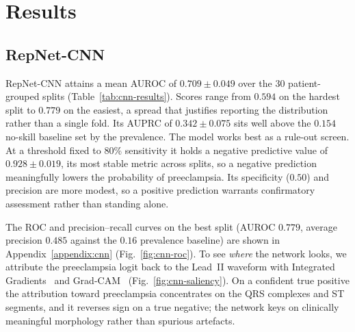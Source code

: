 \documentclass[sigconf,nonacm]{acmart}
\begin{document}
\section{Results}
\label{sec:results}

\subsection{RepNet-CNN}
\label{sec:results-cnn}

RepNet-CNN attains a mean AUROC of $0.709 \pm 0.049$ over the $30$
patient-grouped splits (Table~\ref{tab:cnn-results}). Scores range from
$0.594$ on the hardest split to $0.779$ on the easiest, a spread that
justifies reporting the distribution rather than a single fold. Its AUPRC of
$0.342 \pm 0.075$ sits well above the $0.154$ no-skill baseline set by the
prevalence. The model works best as a rule-out screen. At a threshold fixed to
$80\%$ sensitivity it holds a negative predictive value of $0.928 \pm 0.019$,
its most stable metric across splits, so a negative prediction meaningfully
lowers the probability of preeclampsia. Its specificity ($0.50$) and precision
are more modest, so a positive prediction warrants confirmatory assessment
rather than standing alone.

\begin{table}[H]
\centering
\caption{RepNet-CNN performance by operating point over $30$ patient-grouped
splits (percent, mean $\pm$ std). AUROC and AUPRC are threshold-free.}
\label{tab:cnn-results}
\footnotesize
\setlength{\tabcolsep}{2.7pt}
\end{table}

The ROC and precision--recall curves on the best split (AUROC $0.779$,
average precision $0.485$ against the $0.16$ prevalence baseline) are shown in
Appendix~\ref{appendix:cnn} (Fig.~\ref{fig:cnn-roc}). To see \emph{where}
the network looks, we attribute the preeclampsia logit back to the Lead~II
waveform with Integrated Gradients~\cite{sundararajan_axiomatic_2017} and Grad-CAM~\cite{selvaraju_grad-cam_2020} (Fig.~\ref{fig:cnn-saliency}).
On a confident true positive the attribution toward preeclampsia concentrates
on the QRS complexes and ST segments, and it reverses sign on a true negative;
the network keys on clinically meaningful morphology rather than spurious
artefacts.
\end{document}
